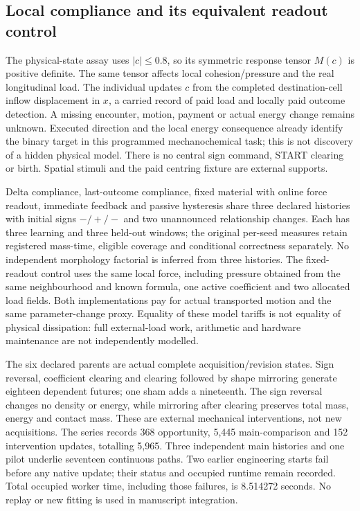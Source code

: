 \subsection*{Local compliance and its equivalent readout control}

The physical-state assay uses $|c|\leq0.8$, so its symmetric response tensor $M(c)$ is positive definite. The same tensor affects local cohesion/pressure and the real longitudinal load. The individual updates $c$ from the completed destination-cell inflow displacement in $x$, a carried record of paid load and locally paid outcome detection. A missing encounter, motion, payment or actual energy change remains unknown. Executed direction and the local energy consequence already identify the binary target in this programmed mechanochemical task; this is not discovery of a hidden physical model. There is no central sign command, START clearing or birth. Spatial stimuli and the paid centring fixture are external supports.

Delta compliance, last-outcome compliance, fixed material with online force readout, immediate feedback and passive hysteresis share three declared histories with initial signs $-/+/-$ and two unannounced relationship changes. Each has three learning and three held-out windows; the original per-seed measures retain registered mass-time, eligible coverage and conditional correctness separately. No independent morphology factorial is inferred from three histories. The fixed-readout control uses the same local force, including pressure obtained from the same neighbourhood and known formula, one active coefficient and two allocated load fields. Both implementations pay for actual transported motion and the same parameter-change proxy. Equality of these model tariffs is not equality of physical dissipation: full external-load work, arithmetic and hardware maintenance are not independently modelled.

The six declared parents are actual complete acquisition/revision states. Sign reversal, coefficient clearing and clearing followed by shape mirroring generate eighteen dependent futures; one sham adds a nineteenth. The sign reversal changes no density or energy, while mirroring after clearing preserves total mass, energy and contact mass. These are external mechanical interventions, not new acquisitions. The series records 368 opportunity, 5,445 main-comparison and 152 intervention updates, totalling 5,965. Three independent main histories and one pilot underlie seventeen continuous paths. Two earlier engineering starts fail before any native update; their status and occupied runtime remain recorded. Total occupied worker time, including those failures, is 8.514272 seconds. No replay or new fitting is used in manuscript integration.
